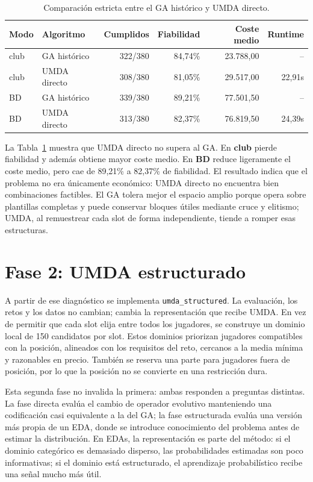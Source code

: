 \documentclass[10pt,a4paper]{article}
\begin{document}
\begin{table}[h]
\centering
\begin{tabular}{llrrrr}
\toprule
Modo & Algoritmo & Cumplidos & Fiabilidad & Coste medio & Runtime \\
\midrule
club & GA histórico & 322/380 & 84,74\% & 23.788,00 & -- \\
club & UMDA directo & 308/380 & 81,05\% & 29.517,00 & 22,91s \\
BD & GA histórico & 339/380 & 89,21\% & 77.501,50 & -- \\
BD & UMDA directo & 313/380 & 82,37\% & 76.819,50 & 24,39s \\
\bottomrule
\end{tabular}
\caption{Comparación estricta entre el GA histórico y UMDA directo.}
\label{tab:directo}
\end{table}

La Tabla~\ref{tab:directo} muestra que UMDA directo no supera al GA. En \textbf{club} pierde fiabilidad y además obtiene mayor coste medio. En \textbf{BD} reduce ligeramente el coste medio, pero cae de 89,21\% a 82,37\% de fiabilidad. El resultado indica que el problema no era únicamente económico: UMDA directo no encuentra bien combinaciones factibles. El GA tolera mejor el espacio amplio porque opera sobre plantillas completas y puede conservar bloques útiles mediante cruce y elitismo; UMDA, al remuestrear cada slot de forma independiente, tiende a romper esas estructuras.

\section{Fase 2: UMDA estructurado}

A partir de ese diagnóstico se implementa \texttt{umda\_structured}. La evaluación, los retos y los datos no cambian; cambia la representación que recibe UMDA. En vez de permitir que cada slot elija entre todos los jugadores, se construye un dominio local de 150 candidatos por slot. Estos dominios priorizan jugadores compatibles con la posición, alineados con los requisitos del reto, cercanos a la media mínima y razonables en precio. También se reserva una parte para jugadores fuera de posición, por lo que la posición no se convierte en una restricción dura.

Esta segunda fase no invalida la primera: ambas responden a preguntas distintas. La fase directa evalúa el cambio de operador evolutivo manteniendo una codificación casi equivalente a la del GA; la fase estructurada evalúa una versión más propia de un EDA, donde se introduce conocimiento del problema antes de estimar la distribución. En EDAs, la representación es parte del método: si el dominio categórico es demasiado disperso, las probabilidades estimadas son poco informativas; si el dominio está estructurado, el aprendizaje probabilístico recibe una señal mucho más útil.
\end{document}
